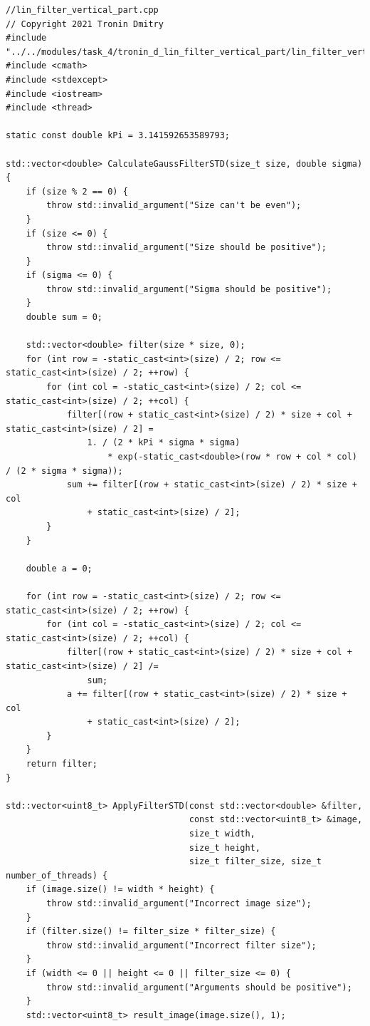 \documentclass{report}
\begin{document}
\begin{lstlisting}[breaklines=true]
//lin_filter_vertical_part.cpp
// Copyright 2021 Tronin Dmitry
#include "../../modules/task_4/tronin_d_lin_filter_vertical_part/lin_filter_vertical_part.h"
#include <cmath>
#include <stdexcept>
#include <iostream>
#include <thread>

static const double kPi = 3.141592653589793;

std::vector<double> CalculateGaussFilterSTD(size_t size, double sigma) {
    if (size % 2 == 0) {
        throw std::invalid_argument("Size can't be even");
    }
    if (size <= 0) {
        throw std::invalid_argument("Size should be positive");
    }
    if (sigma <= 0) {
        throw std::invalid_argument("Sigma should be positive");
    }
    double sum = 0;

    std::vector<double> filter(size * size, 0);
    for (int row = -static_cast<int>(size) / 2; row <= static_cast<int>(size) / 2; ++row) {
        for (int col = -static_cast<int>(size) / 2; col <= static_cast<int>(size) / 2; ++col) {
            filter[(row + static_cast<int>(size) / 2) * size + col + static_cast<int>(size) / 2] =
                1. / (2 * kPi * sigma * sigma)
                    * exp(-static_cast<double>(row * row + col * col) / (2 * sigma * sigma));
            sum += filter[(row + static_cast<int>(size) / 2) * size + col
                + static_cast<int>(size) / 2];
        }
    }

    double a = 0;

    for (int row = -static_cast<int>(size) / 2; row <= static_cast<int>(size) / 2; ++row) {
        for (int col = -static_cast<int>(size) / 2; col <= static_cast<int>(size) / 2; ++col) {
            filter[(row + static_cast<int>(size) / 2) * size + col + static_cast<int>(size) / 2] /=
                sum;
            a += filter[(row + static_cast<int>(size) / 2) * size + col
                + static_cast<int>(size) / 2];
        }
    }
    return filter;
}

std::vector<uint8_t> ApplyFilterSTD(const std::vector<double> &filter,
                                    const std::vector<uint8_t> &image,
                                    size_t width,
                                    size_t height,
                                    size_t filter_size, size_t number_of_threads) {
    if (image.size() != width * height) {
        throw std::invalid_argument("Incorrect image size");
    }
    if (filter.size() != filter_size * filter_size) {
        throw std::invalid_argument("Incorrect filter size");
    }
    if (width <= 0 || height <= 0 || filter_size <= 0) {
        throw std::invalid_argument("Arguments should be positive");
    }
    std::vector<uint8_t> result_image(image.size(), 1);


\end{lstlisting}
\end{document}
